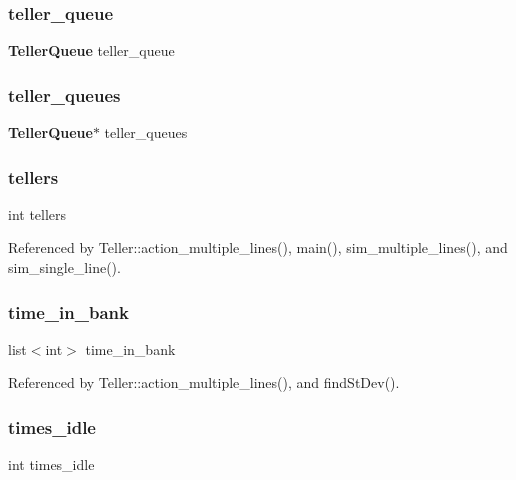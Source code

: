 \subsubsection{teller\+\_\+queue}
{\footnotesize\ttfamily \textbf{ Teller\+Queue} teller\+\_\+queue}

\mbox{\label{teller_8cpp_a0b4f543de738e99fd64f58bb708e2233}} 
\subsubsection{teller\+\_\+queues}
{\footnotesize\ttfamily \textbf{ Teller\+Queue}$\ast$ teller\+\_\+queues}

\mbox{\label{teller_8cpp_a8270f7b245fc61506570bb6b64bbffad}} 
\subsubsection{tellers}
{\footnotesize\ttfamily int tellers}



Referenced by Teller\+::action\+\_\+multiple\+\_\+lines(), main(), sim\+\_\+multiple\+\_\+lines(), and sim\+\_\+single\+\_\+line().

\mbox{\label{teller_8cpp_a95ee0b05d21d70c5ac092558dc43b844}} 
\subsubsection{time\+\_\+in\+\_\+bank}
{\footnotesize\ttfamily list$<$int$>$ time\+\_\+in\+\_\+bank}



Referenced by Teller\+::action\+\_\+multiple\+\_\+lines(), and find\+St\+Dev().

\mbox{\label{teller_8cpp_a0a435446c9f9edf46e5f85d076921492}} 
\subsubsection{times\+\_\+idle}
{\footnotesize\ttfamily int times\+\_\+idle}



